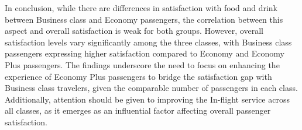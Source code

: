 \documentclass[11pt]{article}
\begin{document}
In conclusion, while there are differences in satisfaction with food and drink between Business class and Economy passengers, the correlation between this aspect and overall satisfaction is weak for both groups. However, overall satisfaction levels vary significantly among the three classes, with Business class passengers expressing higher satisfaction compared to Economy and Economy Plus passengers. The findings underscore the need to focus on enhancing the experience of Economy Plus passengers to bridge the satisfaction gap with Business class travelers, given the comparable number of passengers in each class. Additionally, attention should be given to improving the In-flight service across all classes, as it emerges as an influential factor affecting overall passenger satisfaction.
    


\end{document}
